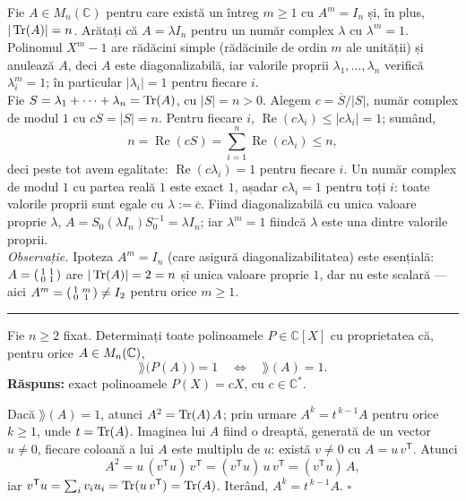 Fie $A\in M_n(\mathbb{C})$ pentru care există un întreg $m\ge1$ cu $A^m=I_n$ și, în plus, $|\operatorname{Tr}(A)|=n$. Arătați că $A=\lambda I_n$ pentru un număr complex $\lambda$ cu $\lambda^m=1$.
\sol Polinomul $X^m-1$ are rădăcini simple (rădăcinile de ordin $m$ ale unității) și anulează $A$, deci $A$ este diagonalizabilă, iar valorile proprii $\lambda_1,\dots,\lambda_n$ verifică $\lambda_i^m=1$; în particular $|\lambda_i|=1$ pentru fiecare $i$.\\[2pt]
Fie $S=\lambda_1+\cdots+\lambda_n=\operatorname{Tr}(A)$, cu $|S|=n>0$. Alegem $c=\overline{S}/|S|$, număr complex de modul $1$ cu $cS=|S|=n$. Pentru fiecare $i$, $\operatorname{Re}(c\lambda_i)\le|c\lambda_i|=1$; sumând,
\[ n=\operatorname{Re}(cS)=\sum_{i=1}^n\operatorname{Re}(c\lambda_i)\le n, \]
deci peste tot avem egalitate: $\operatorname{Re}(c\lambda_i)=1$ pentru fiecare $i$. Un număr complex de modul $1$ cu partea reală $1$ este exact $1$, așadar $c\lambda_i=1$ pentru toți $i$: toate valorile proprii sunt egale cu $\lambda:=\overline{c}$. Fiind diagonalizabilă cu unica valoare proprie $\lambda$, $A=S_0(\lambda I_n)S_0^{-1}=\lambda I_n$; iar $\lambda^m=1$ fiindcă $\lambda$ este una dintre valorile proprii.\\[2pt]
\emph{Observație.} Ipoteza $A^m=I_n$ (care asigură diagonalizabilitatea) este esențială: $A=\begin{psmallmatrix}1&1\\0&1\end{psmallmatrix}$ are $|\operatorname{Tr}(A)|=2=n$ și unica valoare proprie $1$, dar nu este scalară --- aici $A^m=\begin{psmallmatrix}1&m\\0&1\end{psmallmatrix}\neq I_2$ pentru orice $m\ge1$.
\vspace{1mm}\hrule

Fie $n\ge2$ fixat. Determinați toate polinoamele $P\in\mathbb{C}[X]$ cu proprietatea că, pentru orice $A\in M_n(\mathbb{C})$,
\[ \rang\bigl(P(A)\bigr)=1\quad\Longleftrightarrow\quad \rang(A)=1. \]
\textbf{Răspuns:} exact polinoamele $P(X)=cX$, cu $c\in\mathbb{C}^{*}$.

\lema
Dacă $\rang(A)=1$, atunci $A^2=\operatorname{Tr}(A)\,A$; prin urmare $A^k=t^{\,k-1}A$ pentru orice $k\ge1$, unde $t=\operatorname{Tr}(A)$.
\demo Imaginea lui $A$ fiind o dreaptă, generată de un vector $u\neq0$, fiecare coloană a lui $A$ este multiplu de $u$: există $v\neq0$ cu $A=u\,v^{\mathsf T}$. Atunci
\[ A^2=u\,(v^{\mathsf T}u)\,v^{\mathsf T}=(v^{\mathsf T}u)\,u\,v^{\mathsf T}=(v^{\mathsf T}u)\,A, \]
iar $v^{\mathsf T}u=\sum_i v_iu_i=\operatorname{Tr}(u\,v^{\mathsf T})=\operatorname{Tr}(A)$. Iterând, $A^k=t^{\,k-1}A$. $\square$

